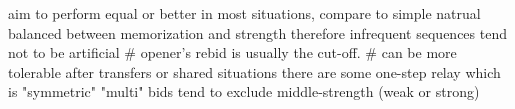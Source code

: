 aim to perform equal or better in most situations, compare to simple natrual
balanced between memorization and strength
    therefore infrequent sequences tend not to be artificial 
    # opener's rebid is usually the cut-off. 
    # can be more tolerable after transfers or shared situations
there are some one-step relay which is "symmetric"
"multi" bids tend to exclude middle-strength (weak or strong)